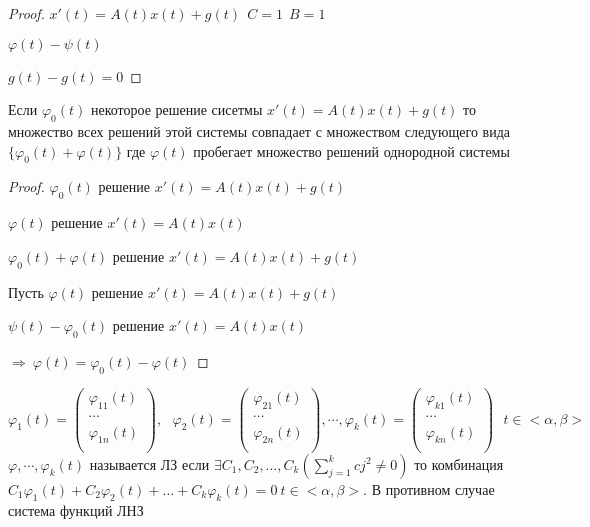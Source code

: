 \begin{proof}
  $x'(t) = A(t)x(t) + g(t) ~~ C = 1 ~~ B = 1$

  $\varphi(t) - \psi(t)$

  $g(t) - g(t) = 0$
\end{proof}

\begin{block}[Слeдствие 2]
  Если $\varphi_0(t)$ некоторое решение сисетмы $x'(t) = A(t)x(t) + g(t)$ то
  множество всех решений этой системы совпадает с множеством следующего вида
  $\{\varphi_0(t) + \varphi(t)\}$ где $\varphi(t)$ пробегает множество решений
  однородной системы
\end{block}

\begin{proof}
  $\varphi_0(t)$ решение $x'(t) = A(t)x(t) + g(t)$

  $\varphi(t)$ решение $x'(t) = A(t)x(t)$

  $\varphi_0(t) + \varphi(t)$ решение $x'(t) = A(t)x(t) + g(t)$

  Пусть $\varphi(t)$ решение $x'(t) = A(t)x(t) + g(t)$

  $\psi(t) - \varphi_0(t)$ решение $x'(t) = A(t)x(t)$

  $\Rightarrow ~ \varphi(t) = \varphi_0(t) - \varphi(t)$
\end{proof}

\begin{define}
  $$
  \varphi_1 (t) =
  \left(
  \begin{array}{c}
    \varphi_{11}(t) \\
    \cdots \\
    \varphi_{1n}(t) \\
  \end{array}
  \right),~~~
  \varphi_2 (t) =
  \left(
  \begin{array}{c}
    \varphi_{21}(t) \\
    \cdots \\
    \varphi_{2n}(t) \\
  \end{array}
  \right), \cdots,
  \varphi_k (t) =
  \left(
  \begin{array}{c}
    \varphi_{k1}(t) \\
    \cdots \\
    \varphi_{kn}(t) \\
  \end{array}
  \right) ~~~ t \in <\alpha, \beta>
  $$
  $\varphi, \cdots, \varphi_k(t)$ называется ЛЗ если $\exists C_1, C_2, \ldots,
  C_k(\sum_{j=1}^k cj^2 \not= 0)$ то комбинация $C_1\varphi_1(t) +
  C_2\varphi_2(t) + \ldots + C_k\varphi_k(t) = 0 ~ t \in <\alpha, \beta>$. В
  противном случае система функций ЛНЗ
\end{define}

